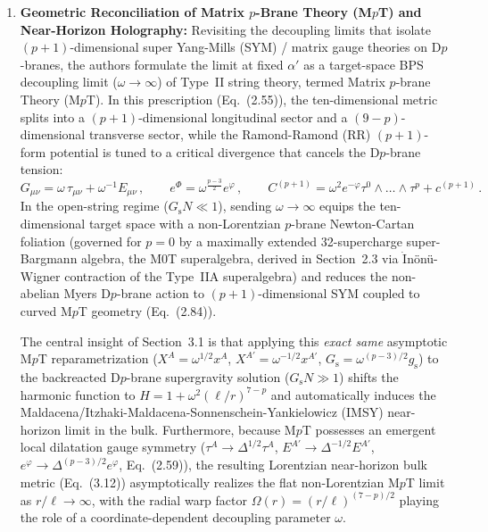 \documentclass[11pt,a4paper]{article}
\begin{document}
\begin{enumerate}[label=(\alph*),leftmargin=1.8em]
    \item \textbf{Geometric Reconciliation of Matrix $p$-Brane Theory (M$p$T) and Near-Horizon Holography:}
    Revisiting the decoupling limits that isolate $(p+1)$-dimensional super Yang-Mills (SYM) / matrix gauge theories on D$p$-branes, the authors formulate the limit at fixed $\alpha'$ as a target-space BPS decoupling limit ($\omega \to \infty$) of Type~II string theory, termed Matrix $p$-brane Theory (M$p$T). In this prescription (Eq.~(2.55)), the ten-dimensional metric splits into a $(p+1)$-dimensional longitudinal sector and a $(9-p)$-dimensional transverse sector, while the Ramond-Ramond (RR) $(p+1)$-form potential is tuned to a critical divergence that cancels the D$p$-brane tension:
    \begin{equation}
        G_{\mu\nu} = \omega\,\tau_{\mu\nu} + \omega^{-1} E_{\mu\nu}\,, \qquad e^{\Phi} = \omega^{\frac{p-3}{2}} e^{\varphi}\,, \qquad C^{(p+1)} = \omega^2 e^{-\varphi}\tau^0 \wedge \dots \wedge \tau^p + c^{(p+1)}\,.
    \end{equation}
    In the open-string regime ($G_{\text{s}}N \ll 1$), sending $\omega \to \infty$ equips the ten-dimensional target space with a non-Lorentzian $p$-brane Newton-Cartan foliation (governed for $p=0$ by a maximally extended 32-supercharge super-Bargmann algebra, the M0T superalgebra, derived in Section~2.3 via $\dot{\text{I}}$n\"on\"u-Wigner contraction of the Type~IIA superalgebra) and reduces the non-abelian Myers D$p$-brane action to $(p+1)$-dimensional SYM coupled to curved M$p$T geometry (Eq.~(2.84)).

    The central insight of Section~3.1 is that applying this \emph{exact same} asymptotic M$p$T reparametrization ($X^A = \omega^{1/2} x^A$, $X^{A'} = \omega^{-1/2} x^{A'}$, $G_{\text{s}} = \omega^{(p-3)/2}g_{\text{s}}$) to the backreacted D$p$-brane supergravity solution ($G_{\text{s}}N \gg 1$) shifts the harmonic function to $H = 1 + \omega^2 (\ell/r)^{7-p}$ and automatically induces the Maldacena/Itzhaki-Maldacena-Sonnenschein-Yankielowicz (IMSY) near-horizon limit in the bulk. Furthermore, because M$p$T possesses an emergent local dilatation gauge symmetry ($\tau^A \to \Delta^{1/2}\tau^A$, $E^{A'} \to \Delta^{-1/2}E^{A'}$, $e^\varphi \to \Delta^{(p-3)/2}e^\varphi$, Eq.~(2.59)), the resulting Lorentzian near-horizon bulk metric (Eq.~(3.12)) asymptotically realizes the flat non-Lorentzian M$p$T limit as $r/\ell \to \infty$, with the radial warp factor $\mathbb{\Omega}(r) = (r/\ell)^{(7-p)/2}$ playing the role of a coordinate-dependent decoupling parameter $\omega$.


\end{enumerate}
\end{document}
